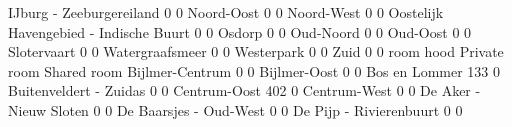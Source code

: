 \documentclass[
]{book}
\newenvironment{Shaded}{\begin{snugshade}}{\end{snugshade}}
\newcommand{\DecValTok}[1]{\textcolor[rgb]{0.00,0.00,0.81}{#1}}
\newcommand{\NormalTok}[1]{#1}
\newcommand{\SpecialCharTok}[1]{\textcolor[rgb]{0.00,0.00,0.00}{#1}}
\begin{document}
\begin{Shaded}
\begin{Highlighting}[]
\NormalTok{  IJburg }\SpecialCharTok{{-}}\NormalTok{ Zeeburgereiland                             }\DecValTok{0}          \DecValTok{0}
\NormalTok{  Noord}\SpecialCharTok{{-}}\NormalTok{Oost                                           }\DecValTok{0}          \DecValTok{0}
\NormalTok{  Noord}\SpecialCharTok{{-}}\NormalTok{West                                           }\DecValTok{0}          \DecValTok{0}
\NormalTok{  Oostelijk Havengebied }\SpecialCharTok{{-}}\NormalTok{ Indische Buurt               }\DecValTok{0}          \DecValTok{0}
\NormalTok{  Osdorp                                               }\DecValTok{0}          \DecValTok{0}
\NormalTok{  Oud}\SpecialCharTok{{-}}\NormalTok{Noord                                            }\DecValTok{0}          \DecValTok{0}
\NormalTok{  Oud}\SpecialCharTok{{-}}\NormalTok{Oost                                             }\DecValTok{0}          \DecValTok{0}
\NormalTok{  Slotervaart                                          }\DecValTok{0}          \DecValTok{0}
\NormalTok{  Watergraafsmeer                                      }\DecValTok{0}          \DecValTok{0}
\NormalTok{  Westerpark                                           }\DecValTok{0}          \DecValTok{0}
\NormalTok{  Zuid                                                 }\DecValTok{0}          \DecValTok{0}
\NormalTok{                                        room}
\NormalTok{hood                                     Private room Shared room}
\NormalTok{  Bijlmer}\SpecialCharTok{{-}}\NormalTok{Centrum                                   }\DecValTok{0}           \DecValTok{0}
\NormalTok{  Bijlmer}\SpecialCharTok{{-}}\NormalTok{Oost                                      }\DecValTok{0}           \DecValTok{0}
\NormalTok{  Bos en Lommer                                   }\DecValTok{133}           \DecValTok{0}
\NormalTok{  Buitenveldert }\SpecialCharTok{{-}}\NormalTok{ Zuidas                            }\DecValTok{0}           \DecValTok{0}
\NormalTok{  Centrum}\SpecialCharTok{{-}}\NormalTok{Oost                                    }\DecValTok{402}           \DecValTok{0}
\NormalTok{  Centrum}\SpecialCharTok{{-}}\NormalTok{West                                      }\DecValTok{0}           \DecValTok{0}
\NormalTok{  De Aker }\SpecialCharTok{{-}}\NormalTok{ Nieuw Sloten                            }\DecValTok{0}           \DecValTok{0}
\NormalTok{  De Baarsjes }\SpecialCharTok{{-}}\NormalTok{ Oud}\SpecialCharTok{{-}}\NormalTok{West                            }\DecValTok{0}           \DecValTok{0}
\NormalTok{  De Pijp }\SpecialCharTok{{-}}\NormalTok{ Rivierenbuurt                           }\DecValTok{0}           \DecValTok{0}

\end{Highlighting}
\end{Shaded}
\end{document}
